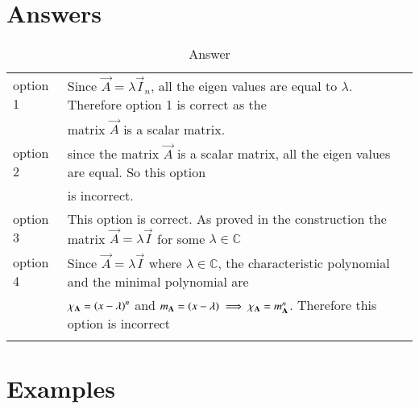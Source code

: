 \documentclass[journal,12pt]{IEEEtran}
\begin{document}
\section{Answers}
\renewcommand{\thetable}{1}
\begin{longtable}{|l|l|}
    \hline
    option 1 & Since $\vec{A}=\lambda\vec{I}_n$, all the eigen values are equal to $\lambda$. Therefore option 1 is correct as the \\
    &matrix $\vec{A}$ is a scalar matrix.\\
    \hline
    option 2 & since the matrix $\vec{A}$ is a scalar matrix, all the eigen values are equal. So this option \\
    &is incorrect.\\
    \hline
    option 3 & This option is correct. As proved in the construction the matrix $\vec{A}=\lambda\vec{I}$ for some $\lambda \in \mathbb{C}$\\
    \hline
    option 4 & Since $\vec{A}=\lambda\vec{I}$ where $\lambda\in\mathbb{C}$, the characteristic polynomial and the minimal polynomial are\\
    & $\chi_\mathbf{A}=\left(x-\lambda\right)^n$ and $m_\mathbf{A}=\left(x-\lambda\right)\implies\chi_\mathbf{A}=m_\mathbf{A}^n$. Therefore this option is incorrect\\
    \hline
    \caption{Answer}
    \label{tab:construction}
\end{longtable}
\section{Examples}
\end{document}

